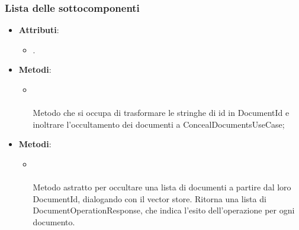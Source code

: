 \documentclass[10pt, a4paper]{article}
\begin{document}
\subsubsection{Lista delle sottocomponenti}

\label{ConcealDocumentsControllerDettaglio}
\begin{itemize}
    \item \textbf{Attributi}:
    \begin{itemize}
        \item {}.
    \end{itemize}
    \item \textbf{Metodi}:
    \begin{itemize}
        \item {}\\ \\
        Metodo che si occupa di trasformare le stringhe di id in DocumentId e inoltrare l'occultamento dei documenti a ConcealDocumentsUseCase;
    \end{itemize}
\end{itemize}


\label{ConcealDocumentsPortDettaglio}
\begin{itemize}
    \item \textbf{Metodi}:
    \begin{itemize}
        \item {}\\ \\
        Metodo astratto per occultare una lista di documenti a partire dal loro DocumentId, dialogando con il vector store. Ritorna una lista di DocumentOperationResponse, che indica l'esito dell'operazione per ogni documento.
    \end{itemize}
\end{itemize}
\end{document}
